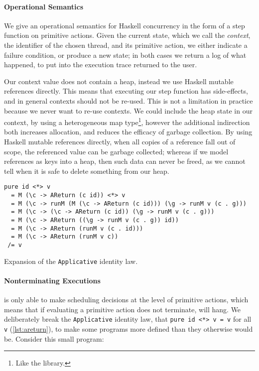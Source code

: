 \paragraph{Operational Semantics}
We give an operational semantics for Haskell concurrency in the form of a step
function on primitive actions.  Given the current state, which we call the
\emph{context}, the identifier of the chosen thread, and its primitive action,
we either indicate a failure condition, or produce a new state; in both cases we
return a log of what happened, to put into the execution trace returned to the
user.

Our context value does not contain a heap, instead we use Haskell mutable
references directly.  This means that executing our step function has
side-effects, and in general contexts should not be re-used.  This is not a
limitation in practice because we never want to re-use contexts.  We could
include the heap state in our context, by using a heterogeneous map
type\footnote{Like the  library.}, however the additional
indirection both increases allocation, and reduces the efficacy of garbage
collection.  By using Haskell mutable references directly, when all copies of a
reference fall out of scope, the referenced value can be garbage collected;
whereas if we model references as keys into a heap, then such data can never be
freed, as we cannot tell when it is safe to delete something from our heap.

\begin{listing}
\begin{verbatim}
pure id <*> v
  = M (\c -> AReturn (c id)) <*> v
  = M (\c -> runM (M (\c -> AReturn (c id))) (\g -> runM v (c . g)))
  = M (\c -> (\c -> AReturn (c id)) (\g -> runM v (c . g)))
  = M (\c -> AReturn ((\g -> runM v (c . g)) id))
  = M (\c -> AReturn (runM v (c . id)))
  = M (\c -> AReturn (runM v c))
 /= v
\end{verbatim}
  \caption{Expansion of the \texttt{Applicative} identity law.}\label{lst:areturn}
\end{listing}

\paragraph{Nonterminating Executions}
\dejafu{} is only able to make scheduling decisions at the level of primitive
actions, which means that if evaluating a primitive action does not terminate,
\dejafu{} will hang.  We deliberately break the \verb|Applicative| identity law,
that \verb|pure id <*> v = v| for all \verb|v| (\cref{lst:areturn}), to make some
programs more defined than they otherwise would be.  Consider this small
program:

